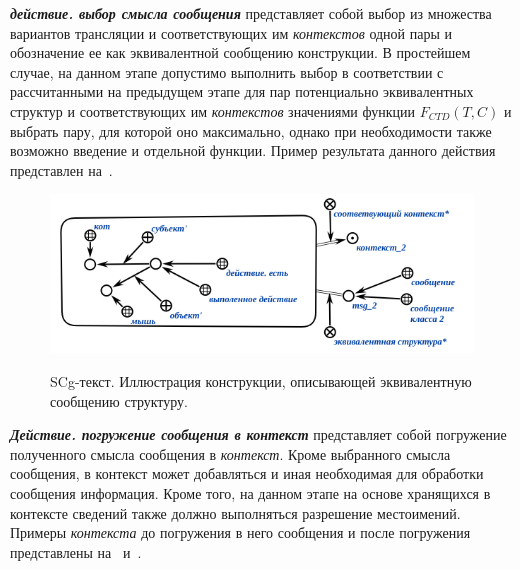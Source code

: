 \textbf{\textit{действие. выбор смысла сообщения}} представляет собой выбор из множества вариантов трансляции и соответствующих им \textit{контекстов} одной пары и обозначение ее как эквивалентной сообщению конструкции.
В простейшем случае, на данном этапе допустимо выполнить выбор в соответствии с рассчитанными на предыдущем этапе для пар потенциально эквивалентных структур и соответствующих им \textit{контекстов} значениями функции \textit{$F_{CTD}(T, C)$} и выбрать пару, для которой оно максимально, однако при необходимости также возможно введение и отдельной функции.
Пример результата данного действия представлен на~\textit{}.

\begin{figure}[H]
    \caption{SCg-текст. Иллюстрация конструкции, описывающей эквивалентную сообщению структуру.}
    \includegraphics[scale=0.8]{images/part4/chapter_nl_interfaces/message_equivalent_structure}
    \label{fig:message_equivalent_structure}
\end{figure}

\textbf{\textit{Действие. погружение сообщения в контекст}} представляет собой погружение полученного смысла сообщения в \textit{контекст}.
Кроме выбранного смысла сообщения, в контекст может добавляться и иная необходимая для обработки сообщения информация.
Кроме того, на данном этапе на основе хранящихся в контексте сведений также должно выполняться разрешение местоимений.
Примеры \textit{контекста} до погружения в него сообщения и после погружения представлены на~\textit{} и~\textit{}.

